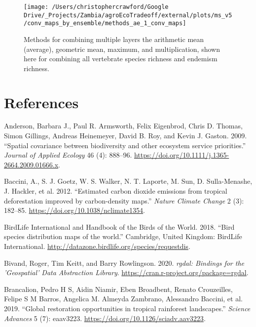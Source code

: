 \documentclass[
]{article}
\begin{document}
\begin{figure}
\texttt{[image: /Users/christophercrawford/Google Drive/\_Projects/Zambia/agroEcoTradeoff/external/plots/ms\_v5/conv\_maps\_by\_ensemble/methods\_ae\_1\_conv\_maps]} \caption{Methods for combining multiple layers the arithmetic mean (average), geometric mean, maximum, and multiplication, shown here for combining all vertebrate species richness and endemism richness.}\label{fig:conv-maps-methods-ae-1}
\end{figure}

\newpage

\hypertarget{references}{%
\section*{References}\label{references}}

\hypertarget{refs}{}
\leavevmode\hypertarget{ref-Anderson2009}{}%
Anderson, Barbara J., Paul R. Armsworth, Felix Eigenbrod, Chris D. Thomas, Simon Gillings, Andreas Heinemeyer, David B. Roy, and Kevin J. Gaston. 2009. ``Spatial covariance between biodiversity and other ecosystem service priorities.'' \emph{Journal of Applied Ecology} 46 (4): 888--96. \url{https://doi.org/10.1111/j.1365-2664.2009.01666.x}.

\leavevmode\hypertarget{ref-Baccini2012}{}%
Baccini, A., S. J. Goetz, W. S. Walker, N. T. Laporte, M. Sun, D. Sulla-Menashe, J. Hackler, et al. 2012. ``Estimated carbon dioxide emissions from tropical deforestation improved by carbon-density maps.'' \emph{Nature Climate Change} 2 (3): 182--85. \url{https://doi.org/10.1038/nclimate1354}.

\leavevmode\hypertarget{ref-BirdLife2018}{}%
BirdLife International and Handbook of the Birds of the World. 2018. ``Bird species distribution maps of the world.'' Cambridge, United Kingdom: BirdLife International. \url{http://datazone.birdlife.org/species/requestdis}.

\leavevmode\hypertarget{ref-R-rgdal}{}%
Bivand, Roger, Tim Keitt, and Barry Rowlingson. 2020. \emph{rgdal: Bindings for the 'Geospatial' Data Abstraction Library}. \url{https://cran.r-project.org/package=rgdal}.

\leavevmode\hypertarget{ref-Brancalion2019}{}%
Brancalion, Pedro H S, Aidin Niamir, Eben Broadbent, Renato Crouzeilles, Felipe S M Barros, Angelica M. Almeyda Zambrano, Alessandro Baccini, et al. 2019. ``Global restoration opportunities in tropical rainforest landscapes.'' \emph{Science Advances} 5 (7): eaav3223. \url{https://doi.org/10.1126/sciadv.aav3223}.
\end{document}
